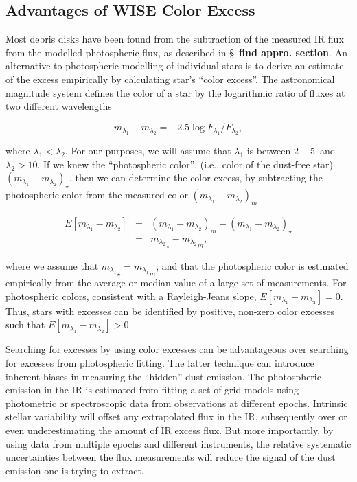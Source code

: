     \subsection{Advantages of WISE Color Excess}\label{sec:advantage_wise}
    
    Most debris disks have been found from the subtraction of the measured IR flux from the modelled photospheric flux, as described in \S~\textbf{find appro. section}. An alternative to photospheric modelling of individual stars is to derive an estimate of the excess empirically by calculating star's ``color excess''. The astronomical magnitude system defines the color of a star by the logarithmic ratio of fluxes at two different wavelengths
    
    \begin{equation}\label{eq:color}
    m_{\lambda_1} - m_{\lambda_2} = -2.5\log{F_{\lambda_1}/F_{\lambda_2}},
    \end{equation}
    
    \noindent where $\lambda_1<\lambda_2$. For our purposes, we will assume that $\lambda_1$ is between $2-5$\micron\ and $\lambda_2>10$\micron. If we knew the ``photospheric color'', (i.e., color of the dust-free star) ${\left(m_{\lambda_1} - m_{\lambda_2}\right)}_\star$, then we can determine the color excess, by subtracting the photospheric color from the measured color ${\left(m_{\lambda_1} - m_{\lambda_2}\right)}_m$
    
    \begin{eqnarray}\label{eq:color_excess}
    E\left[m_{\lambda_1} - m_{\lambda_2}\right] &=& {\left(m_{\lambda_1} - m_{\lambda_2}\right)}_m - {\left(m_{\lambda_1} - m_{\lambda_2}\right)}_\star \\ 
    &=& {m_{\lambda_2}}_\star - {m_{\lambda_2}}_m,
    \end{eqnarray}
    
    \noindent where we assume that ${m_{\lambda_1}}_\star = {m_{\lambda_1}}_m$, and that the photospheric color is estimated empirically from the average or median value of a large set of measurements. For photospheric colors, consistent with a Rayleigh-Jeans slope, $E\left[m_{\lambda_1} - m_{\lambda_2}\right]=0$. Thus, stars with excesses can be identified by positive, non-zero color excesses such that $E\left[m_{\lambda_1} - m_{\lambda_2}\right]>0$. 
    
    
    Searching for excesses by using color excesses can be advantageous over searching for excesses from photospheric fitting. The latter technique can introduce inherent biases in measuring the ``hidden'' dust emission. The photospheric emission in the IR is estimated from fitting a set of grid models using photometric or spectroscopic data from observations at different epochs. Intrinsic stellar variability will offset any extrapolated flux in the IR, subsequently over or even underestimating the amount of IR excess flux. But more importantly, by using data from multiple epochs and different instruments, the relative systematic uncertainties between the flux measurements will reduce the signal of the dust emission one is trying to extract.
    
